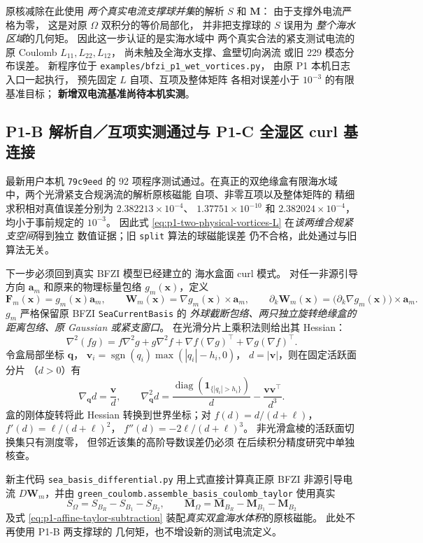 原核减除在此使用
\emph{两个真实电流支撑球并集}的解析
$S$ 和 $\bm M$：
由于支撑外电流严格为零，
这是对原 $\Omega$ 双积分的等价局部化，
并非把支撑球的 $S$ 误用为
\emph{整个海水区域}的几何矩。
因此这一步认证的是实海水域中
两个真实合法的紧支测试电流的
原 Coulomb $L_{11},L_{22},L_{12}$，
尚未触及全海水支撑、盒壁切向涡流
或旧 229 模态分布误差。
新程序位于
\texttt{examples/bfzi\_p1\_wet\_vortices.py}，
由原 P1 本机日志入口一起执行，
预先固定 $L$ 自项、互项及整体矩阵
各相对误差小于 $10^{-3}$ 的有限基准目标；
\textbf{新增双电流基准尚待本机实测}。

\subsection{P1-B 解析自／互项实测通过与 P1-C 全湿区 curl 基连接}
最新用户本机 \texttt{79c9eed} 的
92 项程序测试通过。在真正的双绝缘盒有限海水域
中，两个光滑紧支合规涡流的解析原核磁能
自项、非零互项以及整体矩阵的
精细求积相对真值误差分别为
$2.382213\times10^{-4}$、
$1.37751\times10^{-10}$ 和
$2.382024\times10^{-4}$，
均小于事前规定的 $10^{-3}$。
因此式 \eqref{eq:p1-two-physical-vortices-L}
在\emph{该两维合规紧支空间}得到独立
数值证据；旧 \texttt{split} 算法的球磁能误差
仍不合格，此处通过与旧算法无关。

下一步必须回到真实 BFZI 模型已经建立的
海水盒面 curl 模式。
对任一非源引导方向 $\bm a_m$
和原来的物理标量包络
$g_m(\bm x)$，定义
\[
\bm F_m(\bm x)=g_m(\bm x)\bm a_m,\qquad
\bm W_m(\bm x)=\nabla g_m(\bm x)\times\bm a_m,\qquad
\partial_k\bm W_m(\bm x)
=\bigl(\partial_k\nabla g_m(\bm x)\bigr)\times\bm a_m.
\]
$g_m$ 严格保留原 BFZI
\texttt{SeaCurrentBasis} 的
\emph{外球截断包络、两只独立旋转绝缘盒的
距离包络、原 Gaussian 或紧支窗口}。
在光滑分片上乘积法则给出其 Hessian：
\[
\nabla^2(fg)=
f\nabla^2g+g\nabla^2f+
\nabla f(\nabla g)^\top+
\nabla g(\nabla f)^\top.
\]
令盒局部坐标 $\bm q$，
$\bm v_i=\operatorname{sgn}(q_i)
\max(|q_i|-h_i,0)$，
$d=|\bm v|$，则在固定活跃面分片
（$d>0$）有
\[
\nabla_{\bm q}d=\frac{\bm v}{d},\qquad
\nabla^2_{\bm q}d=
\frac{\operatorname{diag}(
\mathbf1_{\{|q_i|>h_i\}})}d-
\frac{\bm v\bm v^\top}{d^3}.
\]
盒的刚体旋转将此 Hessian
转换到世界坐标；对
$f(d)=d/(d+\ell)$，
$f'(d)=\ell/(d+\ell)^2$，
$f''(d)=-2\ell/(d+\ell)^3$。
非光滑盒棱的活跃面切换集只有测度零，
但邻近该集的高阶导数误差仍必须
在后续积分精度研究中单独核查。

新主代码
\texttt{sea\_basis\_differential.py}
用上式直接计算真正原 BFZI 非源引导电流
$D\bm W_m$，并由
\texttt{green\_coulomb.assemble\_basis\_coulomb\_taylor}
使用真实
\[
S_\Omega=S_{B_R}-S_{B_1}-S_{B_2},\qquad
\bm M_\Omega=\bm M_{B_R}-\bm M_{B_1}-\bm M_{B_2}
\]
及式 \eqref{eq:p1-affine-taylor-subtraction}
装配\emph{真实双盒海水体积}的原核磁能。
此处不再使用 P1-B 两支撑球的
几何矩，也不增设新的测试电流定义。

